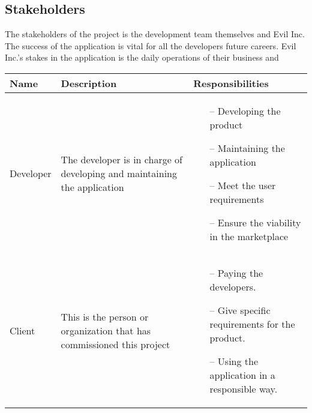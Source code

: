 \documentclass{article}
\begin{document}
\subsection{Stakeholders}
The stakeholders of the project is the development team themselves and Evil Inc. The success of the application is vital for all the developers future careers. Evil Inc.'s stakes in the application is the daily operations of their business and   \vspace{0.2in} \newline 
\begin{tabularx}{1.0\textwidth} { 
  | >{\raggedright\arraybackslash}X 
  | >{\raggedright\arraybackslash}X
  | >{\raggedright\arraybackslash}X | }
    \hline
    \rowcolor{lightgray} Name & Description & Responsibilities \\
    \hline
    Developer & The developer is in charge of developing and maintaining the application &
    \begin{itemize}
        \item[--] Developing the product
        \item[--] Maintaining the application 
        \item[--] Meet the user requirements
        \item[--] Ensure the viability in the marketplace
    \end{itemize}{} \\
    \hline
     Client & This is the person or organization that has commissioned this project &
    \begin{itemize}
        \item[--]  Paying the developers.
        \item[--]  Give specific requirements for the product.
        \item[--]  Using the application in a responsible way. 
    \end{itemize}{} \\
    \hline
    
\end{tabularx}
\end{document}
